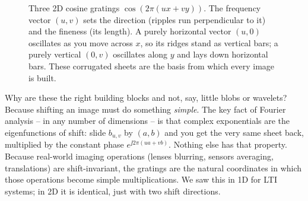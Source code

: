 \begin{figure}[H]
\centering
{}
\caption{Three 2D cosine gratings $\cos(2\pi(ux+vy))$. The frequency vector
$(u,v)$ sets the direction (ripples run perpendicular to it) and the fineness (its
length). A purely horizontal vector $(u,0)$ oscillates as you move across $x$, so
its ridges stand as vertical bars; a purely vertical $(0,v)$ oscillates along $y$
and lays down horizontal bars. These corrugated sheets are the basis from which
every image is built.}
\label{ch31:fig-grating}
\end{figure}
\begin{whybox}
Why are these the right building blocks and not, say, little blobs or wavelets?
Because shifting an image must do something \emph{simple}. The key fact of
Fourier analysis -- in any number of dimensions -- is that complex exponentials are
the eigenfunctions of shift: slide $b_{u,v}$ by $(a,b)$ and you get the very same
sheet back, multiplied by the constant phase $e^{\jj 2\pi(ua+vb)}$. Nothing else
has that property. Because real-world imaging operations (lenses blurring,
sensors averaging, translations) are shift-invariant, the gratings are the natural
coordinates in which those operations become simple multiplications. We saw this
in 1D for LTI systems; in 2D it is identical, just with two shift directions.
\end{whybox}
